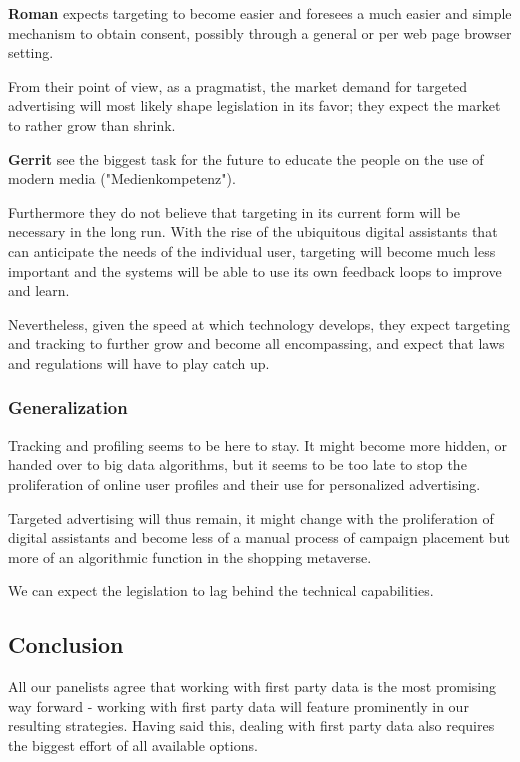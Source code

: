 \textbf{Roman} expects targeting to become easier and foresees a much easier and simple mechanism to obtain consent, possibly through a general or per web page browser setting.

From their point of view, as a pragmatist, the market demand for targeted advertising will most likely shape legislation in its favor; they expect the market to rather grow than shrink.

\textbf{Gerrit} see the biggest task for the future to educate the people on the use of modern media ("Medienkompetenz").

Furthermore they do not believe that targeting in its current form will be necessary in the long run. With the rise of the ubiquitous digital assistants that can anticipate the needs of the individual user, targeting will become much less important and the systems will be able to use its own feedback loops to improve and learn.

Nevertheless, given the speed at which technology develops, they expect targeting and tracking to further grow and become all encompassing, and expect that laws and regulations will have to play catch up.

\subsubsection{Generalization}

Tracking and profiling seems to be here to stay. It might become more hidden, or handed over to big data algorithms, but it seems to be too late to stop the proliferation of online user profiles and their use for personalized advertising.

Targeted advertising will thus remain, it might change with the proliferation of digital assistants and become less of a manual process of campaign placement but more of an algorithmic function in the shopping metaverse.

We can expect the legislation to lag behind the technical capabilities.

\subsection{Conclusion}

All our panelists agree that working with first party data is the most promising way forward - working with first party data will feature prominently in our resulting strategies. Having said this, dealing with first party data also requires the biggest effort of all available options. 

